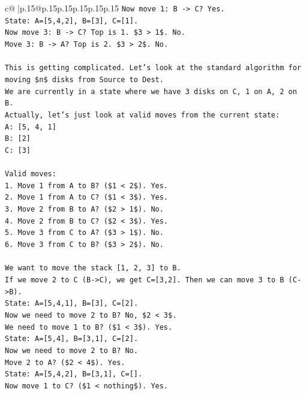 \documentclass{article}
\begin{document}
{\begin{supertabular}{c@{$\;$}|p{.15\linewidth}@{}p{.15\linewidth}p{.15\linewidth}p{.15\linewidth}p{.15\linewidth}p{.15\linewidth}}
{{{\texttt{Now move 1: B {-}> C? Yes.} \\
\texttt{State: A={[}5,4,2{]}, B={[}3{]}, C={[}1{]}.} \\
\texttt{Now move 3: B {-}> C? Top is 1. \$3 > 1\$. No.} \\
\texttt{Move 3: B {-}> A? Top is 2. \$3 > 2\$. No.} \\
\\ 
\texttt{This is getting complicated. Let's look at the standard algorithm for moving \$n\$ disks from Source to Dest.} \\
\texttt{We are currently in a state where we have 3 disks on C, 1 on A, 2 on B.} \\
\texttt{Actually, let's just look at valid moves from the current state:} \\
\texttt{A: {[}5, 4, 1{]}} \\
\texttt{B: {[}2{]}} \\
\texttt{C: {[}3{]}} \\
\\ 
\texttt{Valid moves:} \\
\texttt{1. Move 1 from A to B? (\$1 < 2\$). Yes.} \\
\texttt{2. Move 1 from A to C? (\$1 < 3\$). Yes.} \\
\texttt{3. Move 2 from B to A? (\$2 > 1\$). No.} \\
\texttt{4. Move 2 from B to C? (\$2 < 3\$). Yes.} \\
\texttt{5. Move 3 from C to A? (\$3 > 1\$). No.} \\
\texttt{6. Move 3 from C to B? (\$3 > 2\$). No.} \\
\\ 
\texttt{We want to move the stack {[}1, 2, 3{]} to B.} \\
\texttt{If we move 2 to C (B{-}>C), we get C={[}3,2{]}. Then we can move 3 to B (C{-}>B).} \\
\texttt{State: A={[}5,4,1{]}, B={[}3{]}, C={[}2{]}.} \\
\texttt{Now we need to move 2 to B? No, \$2 < 3\$.} \\
\texttt{We need to move 1 to B? (\$1 < 3\$). Yes.} \\
\texttt{State: A={[}5,4{]}, B={[}3,1{]}, C={[}2{]}.} \\
\texttt{Now we need to move 2 to B? No.} \\
\texttt{Move 2 to A? (\$2 < 4\$). Yes.} \\
\texttt{State: A={[}5,4,2{]}, B={[}3,1{]}, C={[}{]}.} \\
\texttt{Now move 1 to C? (\$1 < nothing\$). Yes.} \\
}}}
\end{supertabular}}
\end{document}
